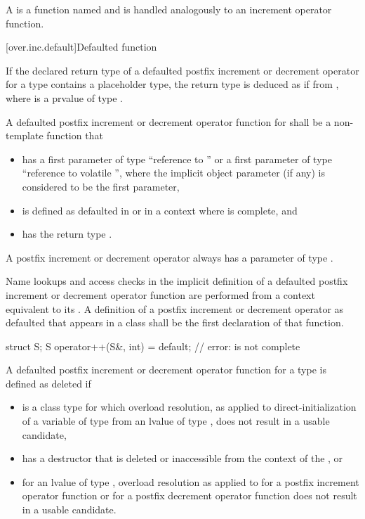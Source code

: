 \pnum
{}%
A 
is a function named 
and is handled analogously to an increment operator function.

[over.inc.default]{Defaulted function}

\pnum
If the declared return type of a defaulted postfix increment or
decrement operator for a type  contains a placeholder type,
the return type is deduced as if from ,
where  is a prvalue of type .

\pnum
A defaulted postfix increment or decrement operator function
for  shall be a non-template function that
\begin{itemize}
\item
has a first parameter of type ``reference to '' or
a first parameter of type ``reference to volatile '',
where the implicit object parameter (if any)
is considered to be the first parameter,
\item
is defined as defaulted in  or
in a context where  is complete, and
\item
has the return type .
\end{itemize}
\begin{note}
A postfix increment or decrement operator
always has a parameter of type .
\end{note}
Name lookups and access checks
in the implicit definition of
a defaulted postfix increment or decrement operator function
are performed from a context equivalent to its .
A definition of a postfix increment or decrement operator as defaulted
that appears in a class shall be the first declaration of that function.
\begin{example}
\begin{codeblock}
struct S;
S operator++(S&, int) = default;        // error:  is not complete
\end{codeblock}
\end{example}

\pnum
A defaulted postfix increment or decrement operator function
for a type 
is defined as deleted if
\begin{itemize}
\item
{} is a class type for which overload resolution,
as applied to direct-initialization of a variable of type 
from an lvalue of type , does not result in a usable candidate,
\item
{} has a destructor that is deleted or inaccessible
from the context of the , or
\item
for an lvalue  of type ,
overload resolution as applied to
 for a postfix increment operator function or
 for a postfix decrement operator function
does not result in a usable candidate.
\end{itemize}

